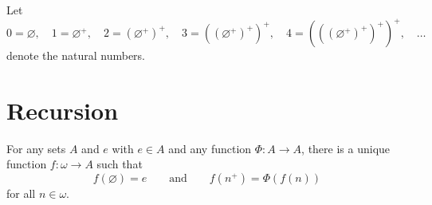 \begin{definition}
  Let
  \begin{equation*}
    0 = \varnothing, \quad
    1 = \varnothing^+, \quad
    2 = (\varnothing^+)^+, \quad
    3 = ((\varnothing^+)^+)^+, \quad
    4 = (((\varnothing^+)^+)^+)^+, \quad
    \dots
  \end{equation*}
  denote the natural numbers.
\end{definition}

\section{Recursion}
\begin{theorem}
  For any sets $A$ and $e$ with $e \in A$ and any function $\Phi: A \to A$,
  there is a unique function $f: \omega \to A$ such that
  \begin{equation*}
    f(\varnothing) = e
    \qquad \text{and} \qquad
    f(n^+) = \Phi(f(n))
  \end{equation*}
  for all $n \in \omega$.
\end{theorem}
